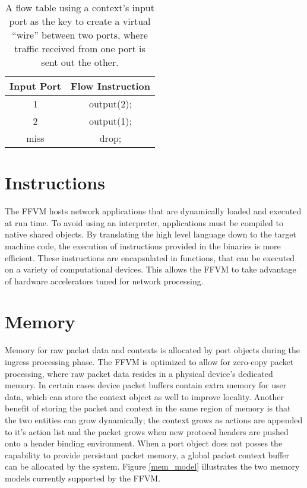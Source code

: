 \begin{table}[h]
  \centering
  \begin{tabular}{||c | c||}
   \hline
   Input Port & Flow Instruction \\ [0.5ex]
   \hline\hline
   1 & output(2); \\
   \hline
   2 & output(1); \\
   \hline
   miss & drop; \\ [1ex]
   \hline
 \end{tabular}
 \caption{A flow table using a context's input port as the key to create a
 virtual ``wire'' between two ports, where traffic received from one port is
 sent out the other.}
 \label{flow_table}
\end{table}

\section{Instructions}
\label{vm:insn}
The FFVM hosts network applications that are dynamically loaded and executed
at run time. To avoid using an interpreter, applications must be compiled
to native shared objects. By translating the high level language down to the
target machine code, the execution of instructions provided in the binaries is
more efficient. These instructions are encapsulated in functions, that can be
executed on a variety of computational devices. This allows the FFVM to take
advantage of hardware accelerators tuned for network processing.

\section{Memory}
\label{vm:memory}
Memory for raw packet data and contexts is allocated by port objects during the
ingress processing phase. The FFVM is optimized to allow for zero-copy packet
processing, where raw packet data resides in a physical device's dedicated
memory. In certain cases device packet buffers contain extra memory for user
data, which can store the context object as well to improve locality. Another
benefit of storing the packet and context in the same region of memory is that
the two entities can grow dynamically; the context grows as actions are appended
to it's action list and the packet grows when new protocol headers are pushed
onto a header binding environment. When a port object does not posses the
capability to provide persistant packet memory, a global packet context buffer
can be allocated by the system. Figure \ref{mem_model} illustrates the two
memory models currently supported by the FFVM.

